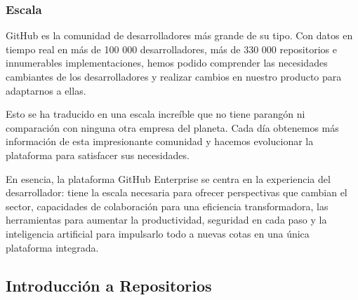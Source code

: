 \subsubsection*{Escala}

GitHub es la comunidad de desarrolladores más grande de su tipo. Con datos en tiempo real en más de 100 000 desarrolladores, más de 330 000 repositorios e innumerables implementaciones, hemos podido comprender las necesidades cambiantes de los desarrolladores y realizar cambios en nuestro producto para adaptarnos a ellas.

Esto se ha traducido en una escala increíble que no tiene parangón ni comparación con ninguna otra empresa del planeta. Cada día obtenemos más información de esta impresionante comunidad y hacemos evolucionar la plataforma para satisfacer sus necesidades.

En esencia, la plataforma GitHub Enterprise se centra en la experiencia del desarrollador: tiene la escala necesaria para ofrecer perspectivas que cambian el sector, capacidades de colaboración para una eficiencia transformadora, las herramientas para aumentar la productividad, seguridad en cada paso y la inteligencia artificial para impulsarlo todo a nuevas cotas en una única plataforma integrada.

\subsection*{Introducción a Repositorios}

